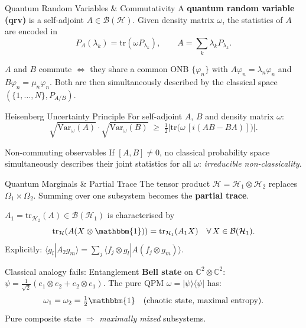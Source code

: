 \documentclass{beamer}
\newcommand{\Hilb}{\mathcal{H}}
\newcommand{\Bound}{\mathcal{B}}
\newcommand{\tr}{\mathrm{tr}}
\newcommand{\ket}[1]{|#1\rangle}
\newcommand{\bra}[1]{\langle#1|}
\newcommand{\Var}{\mathrm{Var}}
\begin{document}
\begin{frame}[shrink=10]{Quantum Random Variables \& Commutativity}
  \small
  A \textbf{quantum random variable (qrv)} is a self-adjoint $A\in\Bound(\Hilb)$.
  Given density matrix $\omega$, the statistics of $A$ are encoded in
  \[
    P_A(\lambda_k) = \tr(\omega P_{\lambda_k}), \qquad A=\sum_k\lambda_k P_{\lambda_k}.
  \]

  \begin{tcolorbox}[thmbox={Commutativity and Classical Description}, left=3pt, right=3pt, top=2pt, bottom=2pt]
    $A$ and $B$ commute $\Leftrightarrow$ they share a common ONB $\{\varphi_n\}$
    with $A\varphi_n=\lambda_n\varphi_n$ and $B\varphi_n=\mu_n\varphi_n$.
    Both are then simultaneously described by the classical space $(\{1,\dots,N\},P_{A/B})$.
  \end{tcolorbox}

  \begin{block}{Heisenberg Uncertainty Principle}
    For self-adjoint $A$, $B$ and density matrix $\omega$:
    \[
      \sqrt{\Var_\omega(A)}\cdot\sqrt{\Var_\omega(B)} \;\ge\;
      \tfrac{1}{2}\bigl|\tr\!\bigl(\omega\,[i(AB-BA)]\bigr)\bigr|.
    \]
  \end{block}

  \begin{alertblock}{Non-commuting observables}
    If $[A,B]\ne 0$, no classical probability space simultaneously describes their
    joint statistics for all $\omega$: \emph{irreducible non-classicality}.
  \end{alertblock}
\end{frame}

\begin{frame}[shrink=10]{Quantum Marginals \& Partial Trace}
  \small
  The tensor product $\Hilb=\Hilb_1\otimes\Hilb_2$ replaces $\Omega_1\times\Omega_2$.
  Summing over one subsystem becomes the \textbf{partial trace}.

  \begin{tcolorbox}[defbox, title={Partial trace}, left=3pt, right=3pt, top=2pt, bottom=2pt]
    $A_1=\tr_{\Hilb_2}(A)\in\Bound(\Hilb_1)$ is characterised by
    \[
      \tr_\Hilb(A(X\otimes\mathbbm{1})) = \tr_{\Hilb_1}(A_1 X) \quad \forall\,X\in\Bound(\Hilb_1).
    \]
    Explicitly: $\langle g_l|A_2 g_m\rangle=\sum_j\langle f_j\otimes g_l|A(f_j\otimes g_m)\rangle$.
  \end{tcolorbox}

  \begin{alertblock}{Classical analogy fails: Entanglement}
    \textbf{Bell state} on $\mathbb{C}^2\otimes\mathbb{C}^2$:
    $\psi=\tfrac{1}{\sqrt{2}}(e_1\otimes e_2+e_2\otimes e_1)$.
    The pure QPM $\omega=\ket\psi\bra\psi$ has:
    \[
      \omega_1 = \omega_2 = \tfrac{1}{2}\mathbbm{1} \quad\text{(chaotic state, maximal entropy)}.
    \]
    Pure composite state $\Rightarrow$ \emph{maximally mixed} subsystems.
  \end{alertblock}
\end{frame}
\end{document}

